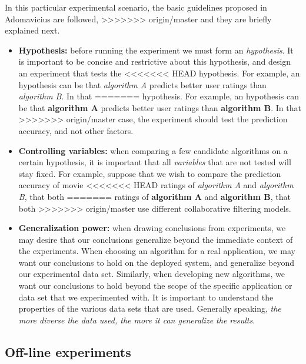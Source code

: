 In this particular experimental scenario, the basic guidelines 
proposed in Adomavicius \cite{adomavicius2011context} are followed,  
>>>>>>> origin/master
and they are briefly explained next. 
\begin{itemize} 
\item \textbf{Hypothesis:} before running the experiment we must form
an \textit{hypothesis}. It is important to be concise and restrictive
about this hypothesis, and design an experiment that tests the
<<<<<<< HEAD
hypothesis. For example, an hypothesis can be that  \textit{algorithm
A} predicts better user ratings than  \textit{algorithm B}.  In that
=======
hypothesis. For example, an hypothesis can be that  \textbf{algorithm
A} predicts better user ratings than  \textbf{algorithm B}.  In that
>>>>>>> origin/master
case, the experiment should test the prediction accuracy, and not
other factors.
\item \textbf{Controlling variables:} when comparing a few candidate
algorithms on a certain hypothesis, it is important that all
\textit{variables} that are not tested will stay fixed. For example,
suppose that we wish to compare the prediction accuracy of movie
<<<<<<< HEAD
ratings of  \textit{algorithm A} and \textit{algorithm B}, that both
=======
ratings of  \textbf{algorithm A} and \textbf{algorithm B}, that both
>>>>>>> origin/master
use different collaborative filtering models.
\item \textbf{Generalization power:} when drawing conclusions from
experiments, we may desire that our conclusions generalize beyond the
immediate context of the experiments. When choosing an algorithm for a
real application, we may want our conclusions to hold on the deployed
system, and generalize beyond our experimental data set. Similarly,
when developing new algorithms, we want our conclusions to hold beyond
the scope of the specific application or data set that we experimented
with. It is important to understand the properties of the various data
sets that are used. Generally speaking, \textit{the more diverse the
data used, the more it can generalize the results}.
\end{itemize} 

\subsection{Off-line experiments} 


